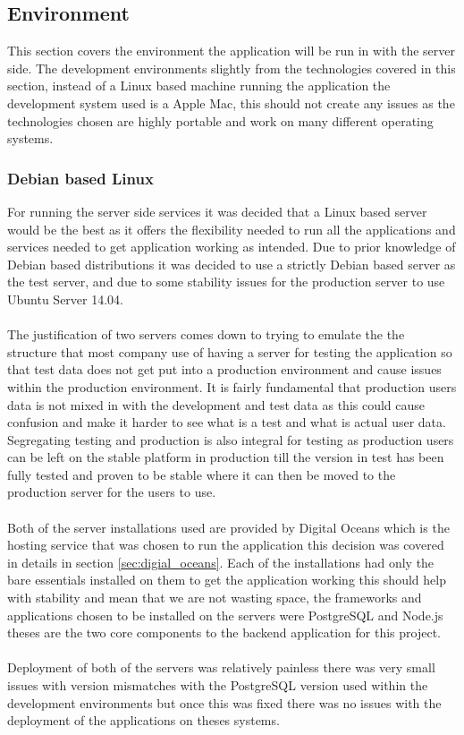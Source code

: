 \subsection{Environment}

This section covers the environment the application will be run in with the server side. The development environments slightly from the technologies covered in this section, instead of a Linux based machine running the application the development system used is a Apple Mac, this should not create any issues as the technologies chosen are highly portable and work on many different operating systems.

\subsubsection{Debian based Linux}
\label{sec:debian_server}

For running the server side services it was decided that a Linux based server would be the best as it offers the flexibility needed to run all the applications and services needed to get application working as intended. Due to prior knowledge of Debian based distributions it was decided to use a strictly Debian based server as the test server, and due to some stability issues for the production server to use Ubuntu Server 14.04.\\
\\
The justification of two servers comes down to trying to emulate the the structure that most company use of having a server for testing the application so that test data does not get put into a production environment and cause issues within the production environment. It is fairly fundamental that production users data is not mixed in with the development and test data as this could cause confusion and make it harder to see what is a test and what is actual user data. Segregating testing and production is also integral for testing as production users can be left on the stable platform in production till the version in test has been fully tested and proven to be stable where it can then be moved to the production server for the users to use.\\
\\
Both of the server installations used are provided by Digital Oceans which is the hosting service that was chosen to run the application this decision was covered in details in section \ref{sec:digial_oceans}. Each of the installations had only the bare essentials installed on them to get the application working this should help with stability and mean that we are not wasting space, the frameworks and applications chosen to be installed on the servers were PostgreSQL and Node.js theses are the two core components to the backend application for this project.\\
\\
Deployment of both of the servers was relatively painless there was very small issues with version mismatches with the PostgreSQL version used within the development environments but once this was fixed there was no issues with the deployment of the applications on theses systems.

